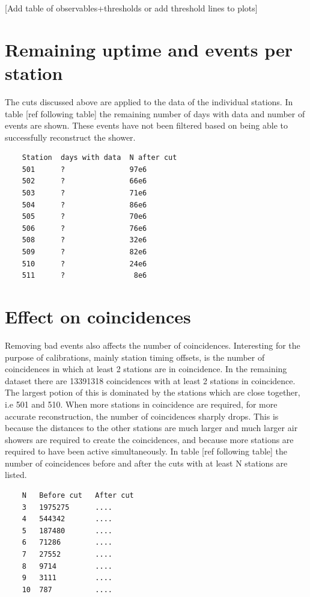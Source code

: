 [Add table of observables+thresholds or add threshold lines to plots]


\section{Remaining uptime and events per station}

The cuts discussed above are applied to the data of the individual stations. In table [ref following table] the remaining number of days with data and number of events are shown. These events have not been filtered based on being able to successfully reconstruct the shower.

\begin{verbatim}
    Station  days with data  N after cut
    501      ?               97e6
    502      ?               66e6
    503      ?               71e6
    504      ?               86e6
    505      ?               70e6
    506      ?               76e6
    508      ?               32e6
    509      ?               82e6
    510      ?               24e6
    511      ?                8e6
\end{verbatim}


\section{Effect on coincidences}

Removing bad events also affects the number of coincidences. Interesting for the purpose of calibrations, mainly station timing offsets, is the number of coincidences in which at least 2 stations are in coincidence. In the remaining dataset there are \num{13391318} coincidences with at least 2 stations in coincidence. The largest potion of this is dominated by the stations which are close together, i.e 501 and 510. When more stations in coincidence are required, for more accurate reconstruction, the number of coincidences sharply drops. This is because the distances to the other stations are much larger and much larger air showers are required to create the coincidences, and because more stations are required to have been active simultaneously. In table [ref following table] the number of coincidences before and after the cuts with at least N stations are listed.

\begin{verbatim}
    N   Before cut   After cut
    3   1975275      ....
    4   544342       ....
    5   187480       ....
    6   71286        ....
    7   27552        ....
    8   9714         ....
    9   3111         ....
    10  787          ....
\end{verbatim}


